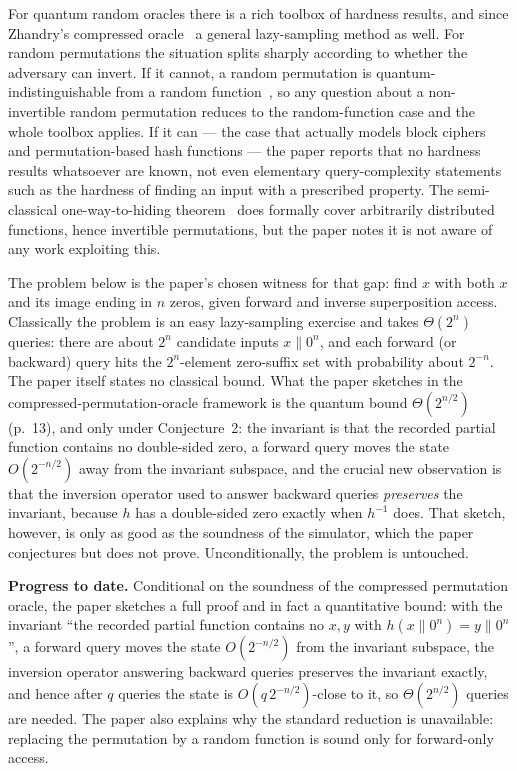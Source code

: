 \documentclass{aicr-conjecture}
\begin{document}
For quantum random oracles there is a rich toolbox of hardness
results, and since Zhandry's compressed oracle~\cite{Zha19} a general
lazy-sampling method as well. For random permutations the situation
splits sharply according to whether the adversary can invert. If it
cannot, a random permutation is quantum-indistinguishable from a
random function~\cite{Zha15}, so any question about a non-invertible
random permutation reduces to the random-function case and the whole
toolbox applies. If it can --- the case that actually models block
ciphers and permutation-based hash functions --- the paper reports
that no hardness results whatsoever are known, not even elementary
query-complexity statements such as the hardness of finding an input
with a prescribed property. The semi-classical one-way-to-hiding
theorem~\cite{AHU19} does formally cover arbitrarily distributed
functions, hence invertible permutations, but the paper notes it is
not aware of any work exploiting this.

The problem below is the paper's chosen witness for that gap: find $x$
with both $x$ and its image ending in $n$ zeros, given forward and
inverse superposition access. Classically the problem is an easy
lazy-sampling exercise and takes $\Theta(2^n)$ queries: there are
about $2^n$ candidate inputs $x \| 0^n$, and each forward (or
backward) query hits the $2^n$-element zero-suffix set with
probability about $2^{-n}$. The paper itself states no classical
bound. What the paper sketches in the compressed-permutation-oracle
framework is the quantum bound $\Theta(2^{n/2})$ (p.~13), and only
under Conjecture~2: the invariant is that the recorded partial
function contains no double-sided zero, a forward query moves the
state $O(2^{-n/2})$ away from the invariant subspace, and the crucial
new observation is that the inversion operator used to answer backward
queries \emph{preserves} the invariant, because $h$ has a double-sided
zero exactly when $h^{-1}$ does. That sketch, however, is only as good
as the soundness of the simulator, which the paper conjectures but
does not prove. Unconditionally, the problem is untouched.

\textbf{Progress to date.} Conditional on the soundness of the
compressed permutation oracle, the paper sketches a full proof and in
fact a quantitative bound: with the invariant ``the recorded partial
function contains no $x, y$ with $h(x\|0^n) = y\|0^n$'', a forward
query moves the state $O(2^{-n/2})$ from the invariant subspace, the
inversion operator answering backward queries preserves the invariant
exactly, and hence after $q$ queries the state is
$O(q\, 2^{-n/2})$-close to it, so $\Theta(2^{n/2})$ queries are
needed. The paper also explains why the standard reduction is
unavailable: replacing the permutation by a random function is sound
only for forward-only access.
\end{document}

